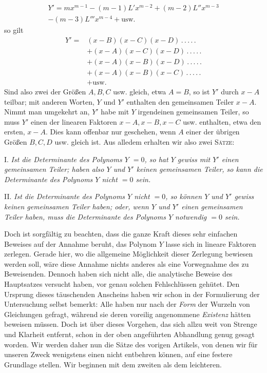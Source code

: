 \[
\begin{gathered}Y'=mx^{m-1}-(m-1)L'x^{m-2}+(m-2)L''x^{m-3}\\-(m-3)L'''x^{m-4}+\text{usw.}\end{gathered}
\]
so gilt
\[
\begin{aligned}
Y'={}&(x-B)(x-C)(x-D)\, .\, .\, .\, .\, .\\
&+(x-A)(x-C)(x-D)\, .\, .\, .\, .\, .\\
&+(x-A)(x-B)(x-D)\, .\, .\, .\, .\, .\\
&+(x-A)(x-B)(x-C)\, .\, .\, .\, .\, .\\
&+\text{usw.}
\end{aligned}
\]
Sind also zwei der Größen $A,B,C$ usw. gleich, etwa $A=B$, so ist $Y'$ durch $x-A$ teilbar; mit anderen Worten, $Y$ und $Y'$ enthalten den gemeinsamen Teiler $x-A$. Nimmt man umgekehrt an, $Y'$ habe mit $Y$ irgendeinen gemeinsamen Teiler, so muss $Y'$ einen der linearen Faktoren $x-A,x-B,x-C$ usw. enthalten, etwa den ersten, $x-A$. Dies kann offenbar nur geschehen, wenn $A$ einer der übrigen Größen $B,C,D$ usw. gleich ist. Aus alledem erhalten wir also zwei \textsc{Sätze}:

I. \textit{Ist die Determinante des Polynoms $Y$ $=0$, so hat $Y$ gewiss mit $Y'$ einen gemeinsamen Teiler; haben also $Y$ und $Y'$ keinen gemeinsamen Teiler, so kann die Determinante des Polynoms $Y$ nicht $=0$ sein.}

II. \textit{Ist die Determinante des Polynoms $Y$ nicht $=0$, so können $Y$ und $Y'$ gewiss keinen gemeinsamen Teiler haben; oder, wenn $Y$ und $Y'$ einen gemeinsamen Teiler haben, muss die Determinante des Polynoms $Y$ notwendig $=0$ sein.}

Doch ist sorgfältig zu beachten, dass die ganze Kraft dieses sehr einfachen Beweises auf der Annahme beruht, das Polynom $Y$ lasse sich in lineare Faktoren zerlegen. Gerade hier, wo die allgemeine Möglichkeit dieser Zerlegung bewiesen werden soll, wäre diese Annahme nichts anderes als eine Vorwegnahme des zu Beweisenden. Dennoch haben sich nicht alle, die analytische Beweise des Hauptsatzes versucht haben, vor genau solchen Fehlschlüssen gehütet. Den Ursprung dieses täuschenden Anscheins haben wir schon in der Formulierung der Untersuchung selbst bemerkt: Alle haben nur nach der \textit{Form} der Wurzeln von Gleichungen gefragt, während sie deren voreilig angenommene \textit{Existenz} hätten beweisen müssen. Doch ist über dieses Vorgehen, das sich allzu weit von Strenge und Klarheit entfernt, schon in der oben angeführten Abhandlung genug gesagt worden. Wir werden daher nun die Sätze des vorigen Artikels,
von denen wir für unseren Zweck wenigstens einen nicht entbehren können, auf eine festere Grundlage stellen. Wir beginnen mit dem zweiten als dem leichteren.

